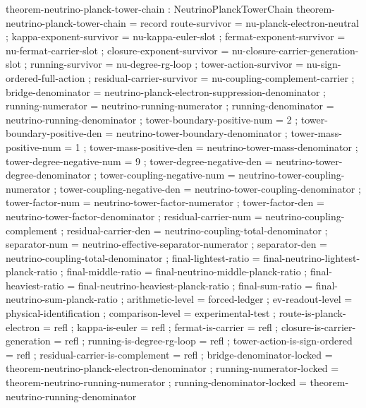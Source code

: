 \documentclass[11pt,a4paper]{book}
\begin{document}
\begin{code}
theorem-neutrino-planck-tower-chain : NeutrinoPlanckTowerChain
theorem-neutrino-planck-tower-chain = record
  { route-survivor                = nu-planck-electron-neutral
  ; kappa-exponent-survivor       = nu-kappa-euler-slot
  ; fermat-exponent-survivor      = nu-fermat-carrier-slot
  ; closure-exponent-survivor     = nu-closure-carrier-generation-slot
  ; running-survivor              = nu-degree-rg-loop
  ; tower-action-survivor         = nu-sign-ordered-full-action
  ; residual-carrier-survivor     = nu-coupling-complement-carrier
  ; bridge-denominator            = neutrino-planck-electron-suppression-denominator
  ; running-numerator             = neutrino-running-numerator
  ; running-denominator           = neutrino-running-denominator
  ; tower-boundary-positive-num   = 2
  ; tower-boundary-positive-den   = neutrino-tower-boundary-denominator
  ; tower-mass-positive-num       = 1
  ; tower-mass-positive-den       = neutrino-tower-mass-denominator
  ; tower-degree-negative-num     = 9
  ; tower-degree-negative-den     = neutrino-tower-degree-denominator
  ; tower-coupling-negative-num   = neutrino-tower-coupling-numerator
  ; tower-coupling-negative-den   = neutrino-tower-coupling-denominator
  ; tower-factor-num              = neutrino-tower-factor-numerator
  ; tower-factor-den              = neutrino-tower-factor-denominator
  ; residual-carrier-num          = neutrino-coupling-complement
  ; residual-carrier-den          = neutrino-coupling-total-denominator
  ; separator-num                 = neutrino-effective-separator-numerator
  ; separator-den                 = neutrino-coupling-total-denominator
  ; final-lightest-ratio          = final-neutrino-lightest-planck-ratio
  ; final-middle-ratio            = final-neutrino-middle-planck-ratio
  ; final-heaviest-ratio          = final-neutrino-heaviest-planck-ratio
  ; final-sum-ratio               = final-neutrino-sum-planck-ratio
  ; arithmetic-level              = forced-ledger
  ; ev-readout-level              = physical-identification
  ; comparison-level              = experimental-test
  ; route-is-planck-electron      = refl
  ; kappa-is-euler                = refl
  ; fermat-is-carrier             = refl
  ; closure-is-carrier-generation = refl
  ; running-is-degree-rg-loop     = refl
  ; tower-action-is-sign-ordered  = refl
  ; residual-carrier-is-complement = refl
  ; bridge-denominator-locked     = theorem-neutrino-planck-electron-denominator
  ; running-numerator-locked      = theorem-neutrino-running-numerator
  ; running-denominator-locked    = theorem-neutrino-running-denominator
}
\end{code}
\end{document}

